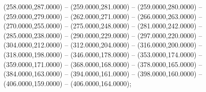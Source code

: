 \begin{scope}[shift={(-231.87,-121.87)}]
\begin{scope}[draw=black,fill=c2b83ba,line join=round,line width=0.208pt]
        (258.0000,287.0000) -- (259.0000,281.0000) -- (259.0000,280.0000) --
        (259.0000,279.0000) -- (262.0000,271.0000) -- (266.0000,263.0000) --
        (270.0000,255.0000) -- (275.0000,248.0000) -- (281.0000,242.0000) --
        (285.0000,238.0000) -- (290.0000,229.0000) -- (297.0000,220.0000) --
        (304.0000,212.0000) -- (312.0000,204.0000) -- (316.0000,200.0000) --
        (318.0000,198.0000) -- (346.0000,178.0000) -- (353.0000,174.0000) --
        (359.0000,171.0000) -- (368.0000,168.0000) -- (378.0000,165.0000) --
        (384.0000,163.0000) -- (394.0000,161.0000) -- (398.0000,160.0000) --
        (406.0000,159.0000) -- (406.0000,164.0000);
  \end{scope}
\end{scope}
\begin{scope}[shift={(-231.87,-121.87)},draw=cff0000,line width=0.800pt]
\end{scope}
